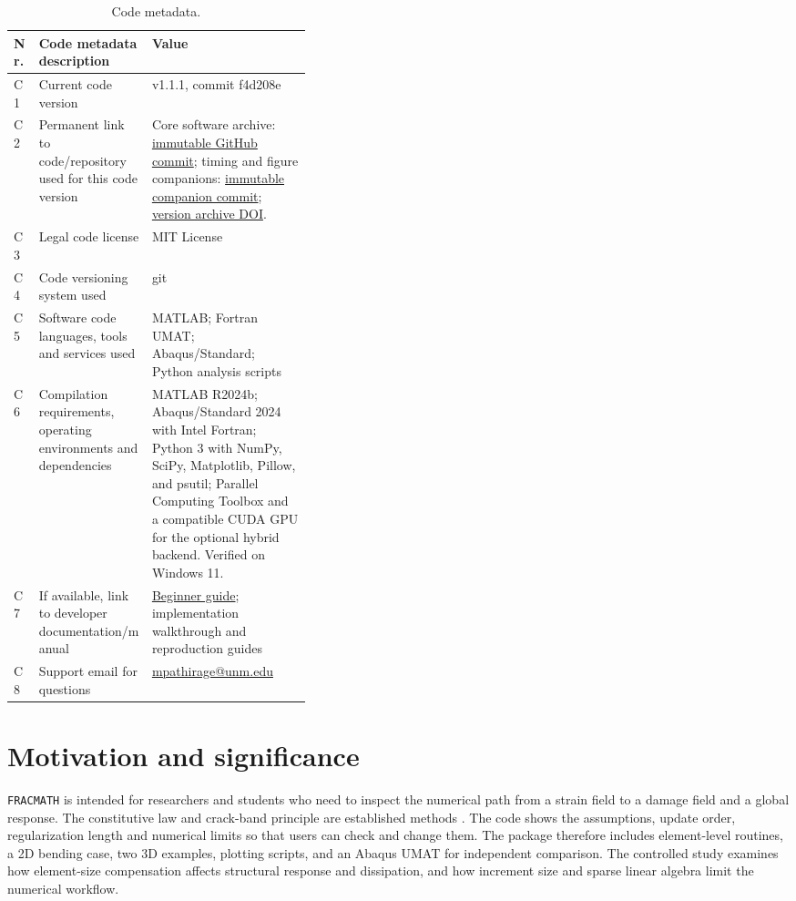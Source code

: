\documentclass[preprint,11pt,a4paper]{elsarticle}
\begin{document}
\begin{table}[H]
\centering
\small
\setlength{\tabcolsep}{5pt}
\renewcommand{\arraystretch}{1.14}
\begin{tabularx}{\linewidth}{@{}lP{0.38\linewidth}Y@{}}
\toprule
\textbf{Nr.} & \textbf{Code metadata description} & \textbf{Value} \\
\midrule
C1 & Current code version & v1.1.1, commit f4d208e \\
C2 & Permanent link to code/repository used for this code version &
Core software archive: \href{https://github.com/Jaykumar9033/FRACMATH/tree/f4d208ecf45b6a4e4d4530e5f71fbf8bcb9f0fe0}{immutable GitHub commit}; timing and figure companions: \href{https://github.com/Jaykumar9033/FRACMATH/tree/8ce589f3a2990779bae01a5e4162946b6a78bc74}{immutable companion commit};
\href{https://doi.org/10.5281/zenodo.23138595}{version archive DOI}. \\
C3 & Legal code license & MIT License \\
C4 & Code versioning system used & git \\
C5 & Software code languages, tools and services used & MATLAB; Fortran UMAT; Abaqus/Standard; Python analysis scripts \\
C6 & Compilation requirements, operating environments and dependencies &
MATLAB R2024b; Abaqus/Standard 2024 with Intel Fortran; Python 3 with NumPy, SciPy, Matplotlib, Pillow, and psutil; Parallel Computing Toolbox and a compatible CUDA GPU for the optional hybrid backend. Verified on Windows 11. \\
C7 & If available, link to developer documentation/manual & \href{https://github.com/Jaykumar9033/FRACMATH/blob/main/softwarex/BEGINNER_GUIDE.md}{Beginner guide}; implementation walkthrough and reproduction guides \\
C8 & Support email for questions & \href{mailto:mpathirage@unm.edu}{mpathirage@unm.edu} \\
\bottomrule
\end{tabularx}
\caption{Code metadata.}
\label{tab:code-metadata}
\end{table}

\section{Motivation and significance}

\texttt{FRACMATH} is intended for researchers and students who need to
inspect the numerical path from a strain field to a damage field and a
global response. The constitutive law and crack-band principle are established
methods \citep{deVree,oliver1989,bazant_oh}. The code shows the assumptions, update order, regularization length
and numerical limits so that users can check and change them. The package therefore includes element-level routines, a 2D bending
case, two 3D examples, plotting scripts, and an Abaqus UMAT for independent
comparison. The controlled study examines how element-size compensation
affects structural response and dissipation, and how increment size and
sparse linear algebra limit the numerical workflow.
\end{document}

